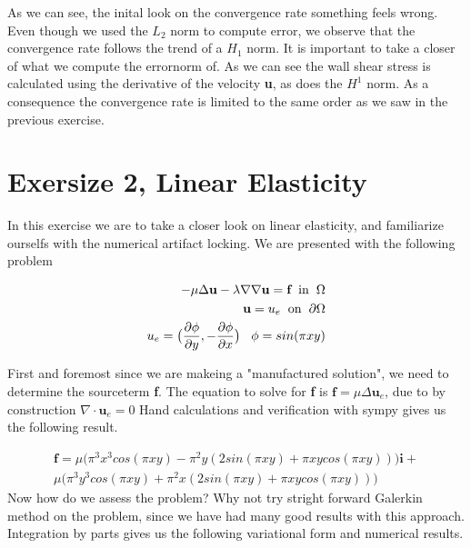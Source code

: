 \documentclass[a4paper,norsk]{article}
\begin{document}
As we can see, the inital look on the convergence rate something feels wrong. Even though we used the $L_2$ norm
to compute error, we observe that the convergence rate follows the trend of a $H_1$ norm. It is important to take a closer of what
we compute the errornorm of. As we can see the wall shear stress is calculated using the derivative of the velocity \textbf{u}, as does the $H^1$ norm. As a consequence the convergence rate is limited to the same order as we saw in the previous exercise.


\section*{Exersize 2, Linear Elasticity}
In this exercise we are to take a closer look on linear elasticity, and familiarize ourselfs with
the numerical artifact locking. We are presented with the following problem

\begin{align*}
-\mu \Delta \textbf{u} - \lambda \nabla \nabla \textbf{u} = \textbf{f} \hspace{2mm} \text{in} \hspace{2mm} \Omega \\
\textbf{u} = u_e \hspace{2mm} \text{on} \hspace{2mm} \partial \Omega \\
u_e = \big(\frac{\partial \phi}{\partial y}, -\frac{\partial \phi}{\partial x} \big) \hspace{3mm}
\phi = sin(\pi x y)
\end{align*}

First and foremost since we are makeing a "manufactured solution", we need to determine the sourceterm \textbf{f}. The equation
to solve for \textbf{f} is $\textbf{f} =\mu  \Delta \textbf{u}_e$, due to by construction $\nabla \cdot \textbf{u}_e = 0$
 Hand calculations and verification with sympy gives us the following result.

\begin{align*}
\textbf{f} = \mu \big(\pi^3 x^3 cos(\pi x y) -\pi^2y (2sin(\pi x y) + \pi x y cos(\pi x y)   ) \big) \textbf{i} + \\
\mu \big( \pi^3y^3 cos(\pi x y) + \pi^2 x (2 sin(\pi x y) + \pi x y cos(\pi x y)   )  \big)
\end{align*}
Now how do we assess the problem? 
Why not try stright forward Galerkin method on the problem, since we have had many good results with this approach.
Integration by parts gives us the following variational form and numerical results.
\end{document}
